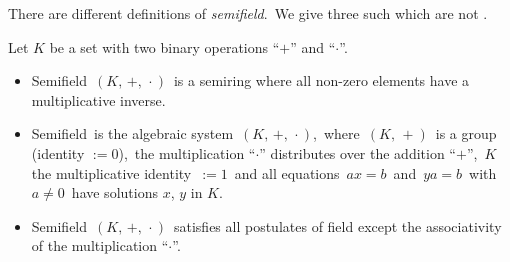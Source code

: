 \documentclass[12pt]{article}
\theoremstyle{definition}
\begin{document}
There are different definitions of {\em semifield}.\, We give three such which are not .

Let $K$ be a set with two binary operations ``$+$'' and ``$\cdot$''.
\begin{itemize}
\item Semifield\, $(K,\,+,\,\cdot)$\, is a semiring where all non-zero elements have a multiplicative inverse.
\item Semifield\, is the algebraic system\, $(K,\,+,\,\cdot)$,\, where\, $(K,\,+)$\, is a group (identity $:= 0$),\, the multiplication ``$\cdot$'' distributes over the addition ``$+$'',\, $K$  the multiplicative identity\, $:= 1$\, and all equations\, $ax = b$\, and\, $ya = b$\, with\, $a \ne 0$\, have solutions $x$, $y$ in $K$.
\item Semifield\, $(K,\,+,\,\cdot)$\, satisfies all postulates of field except the associativity of the multiplication ``$\cdot$''.
\end{itemize}
\end{document}
